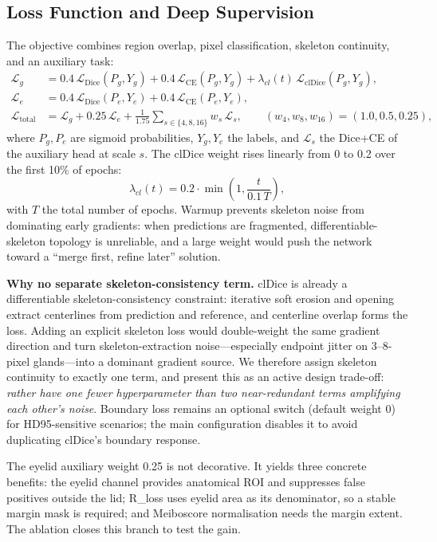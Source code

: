 \subsection{Loss Function and Deep Supervision}\label{sec:loss}

The objective combines region overlap, pixel classification, skeleton continuity, and an auxiliary task:
\begin{align}
\mathcal{L}_{g} &= 0.4\,\mathcal{L}_{\mathrm{Dice}}(P_g,Y_g)+0.4\,\mathcal{L}_{\mathrm{CE}}(P_g,Y_g)
+\lambda_{cl}(t)\,\mathcal{L}_{\mathrm{clDice}}(P_g,Y_g),\\
\mathcal{L}_{e} &= 0.4\,\mathcal{L}_{\mathrm{Dice}}(P_e,Y_e)+0.4\,\mathcal{L}_{\mathrm{CE}}(P_e,Y_e),\\
\mathcal{L}_{\mathrm{total}} &= \mathcal{L}_{g}+0.25\,\mathcal{L}_{e}
+\frac{1}{1.75}\sum_{s\in\{4,8,16\}} w_s\,\mathcal{L}_{s},\qquad (w_4,w_8,w_{16})=(1.0,0.5,0.25),
\end{align}
where $P_g,P_e$ are sigmoid probabilities, $Y_g,Y_e$ the labels, and $\mathcal{L}_{s}$ the Dice+CE of the auxiliary head at scale $s$. The clDice weight rises linearly from 0 to 0.2 over the first 10\% of epochs:
\begin{equation}
\lambda_{cl}(t)=0.2\cdot\min\!\left(1,\frac{t}{0.1\,T}\right),
\end{equation}
with $T$ the total number of epochs. Warmup prevents skeleton noise from dominating early gradients: when predictions are fragmented, differentiable-skeleton topology is unreliable, and a large weight would push the network toward a ``merge first, refine later'' solution.

\textbf{Why no separate skeleton-consistency term.} clDice is already a differentiable skeleton-consistency constraint: iterative soft erosion and opening extract centerlines from prediction and reference, and centerline overlap forms the loss\cite{cldice}. Adding an explicit skeleton loss would double-weight the same gradient direction and turn skeleton-extraction noise---especially endpoint jitter on 3--8-pixel glands---into a dominant gradient source. We therefore assign skeleton continuity to exactly one term, and present this as an active design trade-off: \emph{rather have one fewer hyperparameter than two near-redundant terms amplifying each other's noise}. Boundary loss remains an optional switch (default weight 0) for HD95-sensitive scenarios; the main configuration disables it to avoid duplicating clDice's boundary response.

The eyelid auxiliary weight 0.25 is not decorative. It yields three concrete benefits: the eyelid channel provides anatomical ROI and suppresses false positives outside the lid; R\_loss uses eyelid area as its denominator, so a stable margin mask is required; and Meiboscore normalisation needs the margin extent. The ablation closes this branch to test the gain.

